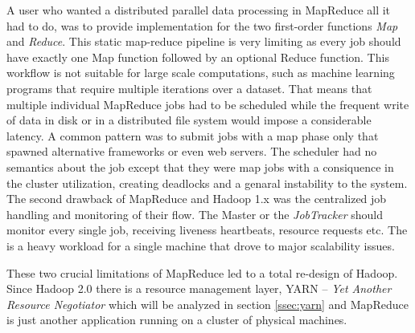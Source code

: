 A user who wanted a distributed parallel data processing in MapReduce
all it had to do, was to provide implementation for the two
first-order functions \emph{Map} and \emph{Reduce}. This static
map-reduce pipeline is very limiting as every job should have exactly one
Map function followed by an optional Reduce function. This workflow is
not suitable for large scale computations, such as machine learning
programs that require multiple iterations over a dataset. That means
that multiple individual MapReduce jobs had to be scheduled while the
frequent write of data in disk or in a distributed file system would
impose a considerable latency. A common pattern
\cite{Vavilapalli:2013:AHY:2523616.2523633} was to submit jobs with a
map phase only that spawned alternative frameworks or even web
servers. The scheduler had no semantics about the job except that they
were map jobs with a consiquence in the cluster utilization, creating
deadlocks and a genaral instability to the system. The second drawback
of MapReduce and Hadoop 1.x was the centralized job handling and
monitoring of their flow. The Master or the \emph{JobTracker} should
monitor every single job, receiving liveness heartbeats, resource
requests etc. The is a heavy workload for a single machine that drove
to major scalability issues.

These two crucial limitations of MapReduce led to a total re-design of
Hadoop. Since Hadoop 2.0 there is a resource management layer, YARN --
\emph{Yet Another Resource Negotiator} which will be analyzed in
section \ref{ssec:yarn} and MapReduce is just another application
running on a cluster of physical machines.